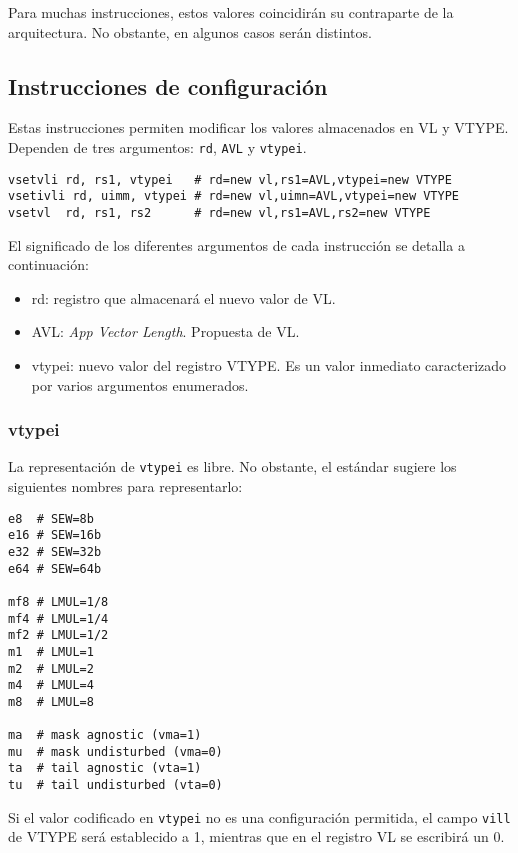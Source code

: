 Para muchas instrucciones, estos valores coincidirán su contraparte de la arquitectura. No obstante, en algunos casos serán distintos.

\subsection{Instrucciones de configuración}\label{conf-instructions}
Estas instrucciones permiten modificar los valores almacenados en VL y VTYPE. Dependen de tres argumentos: \texttt{rd}, \texttt{AVL} y \texttt{vtypei}.

\begin{lstlisting}
vsetvli rd, rs1, vtypei   # rd=new vl,rs1=AVL,vtypei=new VTYPE
vsetivli rd, uimm, vtypei # rd=new vl,uimn=AVL,vtypei=new VTYPE
vsetvl  rd, rs1, rs2      # rd=new vl,rs1=AVL,rs2=new VTYPE
\end{lstlisting}

El significado de los diferentes argumentos de cada instrucción se detalla a continuación:
\begin{itemize}
    \item rd: registro que almacenará el nuevo valor de VL.
    \item AVL: \textit{App Vector Length}. Propuesta de VL.
    \item vtypei: nuevo valor del registro VTYPE. Es un valor inmediato caracterizado por varios argumentos enumerados.
\end{itemize}

\subsubsection{vtypei}
La representación de \texttt{vtypei} es libre. No obstante, el estándar sugiere
los siguientes nombres para representarlo:

\begin{lstlisting}
e8  # SEW=8b   
e16 # SEW=16b
e32 # SEW=32b
e64 # SEW=64b

mf8 # LMUL=1/8
mf4 # LMUL=1/4
mf2 # LMUL=1/2
m1  # LMUL=1
m2  # LMUL=2
m4  # LMUL=4
m8  # LMUL=8

ma  # mask agnostic (vma=1)
mu  # mask undisturbed (vma=0)
ta  # tail agnostic (vta=1)
tu  # tail undisturbed (vta=0)
\end{lstlisting}

Si el valor codificado en \texttt{vtypei} no es una configuración permitida, el
campo \texttt{vill} de VTYPE será establecido a 1, mientras que en el registro
VL se escribirá un 0.

